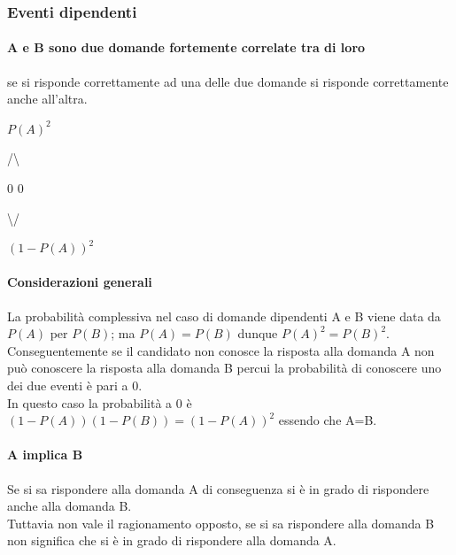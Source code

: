 \subsubsection{Eventi dipendenti}
\label{Eventi dipendenti}
\paragraph{A e B sono due domande fortemente correlate tra di loro} se si risponde correttamente ad una delle due domande si risponde correttamente anche all'altra.

\begin{center} $P(A)^2$ \end{center}
\begin{center} /\textbackslash \end{center}
\begin{center} 0 0  \end{center}
\begin{center} \textbackslash / \end{center}
\begin{center}  $(1- P(A))^2$ \end{center}

\paragraph{Considerazioni generali}
\label{Considerazioni generali eventi dipendenti}
La probabilit\`a complessiva nel caso di domande dipendenti A e B viene data da $P(A)$ per $P(B)$; ma $P(A)=P(B)$ dunque $P(A)^2=P(B)^2$. \\ Conseguentemente se il candidato non conosce la risposta alla domanda A non pu\`o conoscere la risposta alla domanda B percui la probabilit\`a di conoscere uno dei due eventi \`e pari a 0.\\ 
In questo caso la probabilit\`a a 0 \`e   $(1- P(A))(1- P(B))=(1- P(A))^2$
essendo che A=B.

\paragraph{A implica B}
\label{A implica B}
Se si sa rispondere alla domanda A di conseguenza si \`e in grado di rispondere anche alla domanda B.\\
Tuttavia non vale il ragionamento opposto, se si sa rispondere alla domanda B non significa che si \`e in grado di rispondere alla domanda A.

